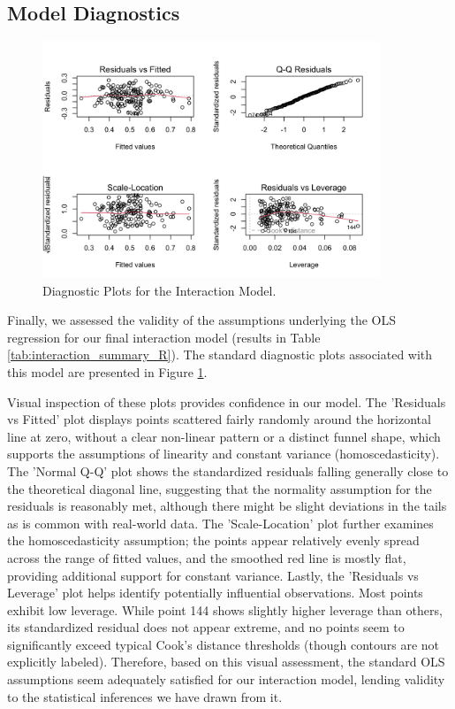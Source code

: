 \documentclass[11pt, a4paper]{article} %
\begin{document}
\subsection{Model Diagnostics}
\begin{figure}[htbp] 
    \centering
    \includegraphics[width=0.9\textwidth]{figure/diagnostic_plots_mydf_2005_2009.png} 
    \caption{Diagnostic Plots for the Interaction Model.} 
    \label{fig:diagnostic_plots_interaction}
\end{figure}
\FloatBarrier %
Finally, we assessed the validity of the assumptions underlying the OLS regression for our final interaction model (results in Table \ref{tab:interaction_summary_R}). The standard diagnostic plots associated with this model are presented in Figure \ref{fig:diagnostic_plots_interaction}. 

Visual inspection of these plots provides confidence in our model. The 'Residuals vs Fitted' plot displays points scattered fairly randomly around the horizontal line at zero, without a clear non-linear pattern or a distinct funnel shape, which supports the assumptions of linearity and constant variance (homoscedasticity). The 'Normal Q-Q' plot shows the standardized residuals falling generally close to the theoretical diagonal line, suggesting that the normality assumption for the residuals is reasonably met, although there might be slight deviations in the tails as is common with real-world data. The 'Scale-Location' plot further examines the homoscedasticity assumption; the points appear relatively evenly spread across the range of fitted values, and the smoothed red line is mostly flat, providing additional support for constant variance. Lastly, the 'Residuals vs Leverage' plot helps identify potentially influential observations. Most points exhibit low leverage. While point 144 shows slightly higher leverage than others, its standardized residual does not appear extreme, and no points seem to significantly exceed typical Cook's distance thresholds (though contours are not explicitly labeled). Therefore, based on this visual assessment, the standard OLS assumptions seem adequately satisfied for our interaction model, lending validity to the statistical inferences we have drawn from it.
\end{document}
